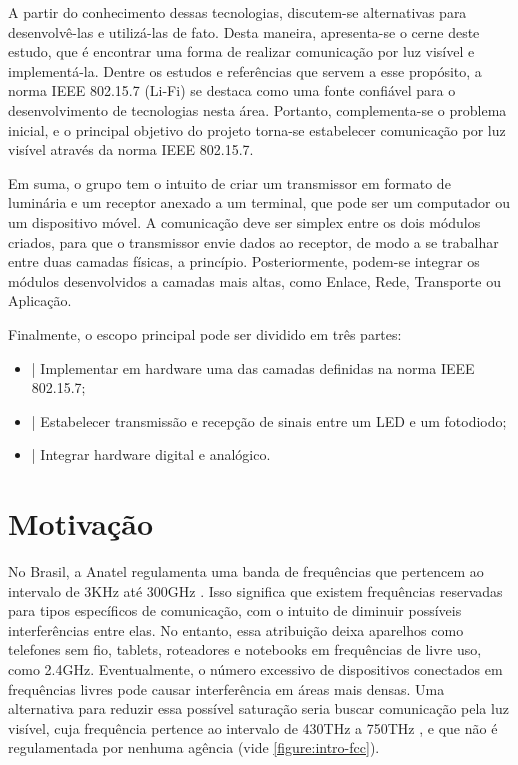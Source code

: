 	A partir do conhecimento dessas tecnologias, discutem-se alternativas para desenvolvê-las e utilizá-las de fato. Desta maneira, apresenta-se o cerne deste estudo, que é encontrar uma forma de realizar comunicação por luz visível e implementá-la. Dentre os estudos e referências que servem a esse propósito, a norma IEEE 802.15.7 \cite{lifi-standard}(Li-Fi) se destaca como uma fonte confiável para o desenvolvimento de tecnologias nesta área. Portanto, complementa-se o problema inicial, e o principal objetivo do projeto torna-se estabelecer comunicação por luz visível através da norma IEEE 802.15.7. \par
	
	Em suma, o grupo tem o intuito de criar um transmissor em formato de luminária e um receptor anexado a um terminal, que pode ser um computador ou um dispositivo móvel. A comunicação deve ser simplex entre os dois módulos criados, para que o transmissor envie dados ao receptor, de modo a se trabalhar entre duas camadas físicas, a princípio. Posteriormente, podem-se integrar os módulos desenvolvidos a camadas mais altas, como Enlace, Rede, Transporte ou Aplicação. \par
	
	Finalmente, o escopo principal pode ser dividido em três partes:	
	\begin{itemize}
		\item |	Implementar em hardware uma das camadas definidas na norma IEEE 802.15.7;
		\item |	Estabelecer transmissão e recepção de sinais entre um LED e um fotodiodo;
		\item |	Integrar hardware digital e analógico.
	\end{itemize}

	\section*{Motivação}\label{sec-motivacao}
		
	No Brasil, a Anatel regulamenta uma banda de frequências que pertencem ao intervalo  de 3KHz até 300GHz \cite{faixa-anatel}. Isso significa que existem frequências reservadas para tipos específicos de comunicação, com o intuito de diminuir possíveis interferências entre elas. No entanto, essa atribuição deixa aparelhos como telefones sem fio, tablets, roteadores e notebooks em frequências de livre uso, como 2.4GHz. Eventualmente, o número excessivo de dispositivos conectados em  frequências livres pode causar interferência em áreas mais densas. Uma alternativa para reduzir essa possível saturação seria buscar comunicação pela luz visível, cuja frequência pertence ao intervalo de 430THz a 750THz \cite{vision}, e que não é regulamentada por nenhuma agência (vide \autoref{figure:intro-fcc}). \par
	
